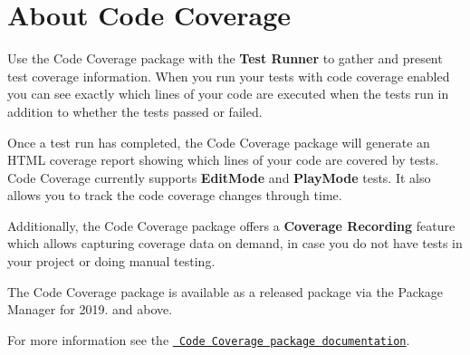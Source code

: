 \chapter{About Code Coverage}
\hypertarget{md__library_2_package_cache_2com_8unity_8testtools_8codecoverage_0d1_82_85_2_r_e_a_d_m_e}{}\label{md__library_2_package_cache_2com_8unity_8testtools_8codecoverage_0d1_82_85_2_r_e_a_d_m_e}
\label{md__library_2_package_cache_2com_8unity_8testtools_8codecoverage_0d1_82_85_2_r_e_a_d_m_e_autotoc_md885}%
%
 Use the Code Coverage package with the {\bfseries{Test Runner}} to gather and present test coverage information. When you run your tests with code coverage enabled you can see exactly which lines of your code are executed when the tests run in addition to whether the tests passed or failed.

Once a test run has completed, the Code Coverage package will generate an HTML coverage report showing which lines of your code are covered by tests. Code Coverage currently supports {\bfseries{Edit\+Mode}} and {\bfseries{Play\+Mode}} tests. It also allows you to track the code coverage changes through time.

Additionally, the Code Coverage package offers a {\bfseries{Coverage Recording}} feature which allows capturing coverage data on demand, in case you do not have tests in your project or doing manual testing.

The Code Coverage package is available as a released package via the Package Manager for  2019. and above.

For more information see the \href{https://docs.unity3d.com/Packages/com.unity.testtools.codecoverage@latest}{\texttt{ Code Coverage package documentation}}. 